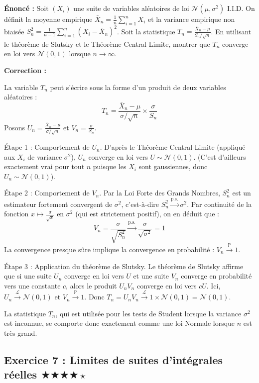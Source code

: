 \documentclass[11pt,a4paper]{article}
\begin{document}
\textbf{Énoncé :}
Soit $(X_i)$ une suite de variables aléatoires de loi $\mathcal{N}(\mu, \sigma^2)$ I.I.D.
On définit la moyenne empirique $\bar{X}_n = \frac{1}{n} \sum_{i=1}^n X_i$ et la variance empirique non biaisée $S_n^2 = \frac{1}{n-1} \sum_{i=1}^n (X_i - \bar{X}_n)^2$.
Soit la statistique $T_n = \frac{\bar{X}_n - \mu}{S_n / \sqrt{n}}$.
En utilisant le théorème de Slutsky et le Théorème Central Limite, montrer que $T_n$ converge en loi vers $\mathcal{N}(0, 1)$ lorsque $n \to \infty$.

\textbf{Correction :}

La variable $T_n$ peut s'écrire sous la forme d'un produit de deux variables aléatoires :
$$T_n = \frac{\bar{X}_n - \mu}{\sigma / \sqrt{n}} \times \frac{\sigma}{S_n}$$
Posons $U_n = \frac{\bar{X}_n - \mu}{\sigma / \sqrt{n}}$ et $V_n = \frac{\sigma}{S_n}$.

Étape 1 : Comportement de $U_n$.
D'après le Théorème Central Limite (appliqué aux $X_i$ de variance $\sigma^2$), $U_n$ converge en loi vers $U \sim \mathcal{N}(0, 1)$. (C'est d'ailleurs exactement vrai pour tout $n$ puisque les $X_i$ sont gaussiennes, donc $U_n \sim \mathcal{N}(0, 1)$).

Étape 2 : Comportement de $V_n$.
Par la Loi Forte des Grands Nombres, $S_n^2$ est un estimateur fortement convergent de $\sigma^2$, c'est-à-dire $S_n^2 \xrightarrow{\text{p.s.}} \sigma^2$.
Par continuité de la fonction $x \mapsto \frac{\sigma}{\sqrt{x}}$ en $\sigma^2$ (qui est strictement positif), on en déduit que :
$$V_n = \frac{\sigma}{\sqrt{S_n^2}} \xrightarrow{\text{p.s.}} \frac{\sigma}{\sqrt{\sigma^2}} = 1$$
La convergence presque sûre implique la convergence en probabilité : $V_n \xrightarrow{\mathbb{P}} 1$.

Étape 3 : Application du théorème de Slutsky.
Le théorème de Slutsky affirme que si une suite $U_n$ converge en loi vers $U$ et une suite $V_n$ converge en probabilité vers une constante $c$, alors le produit $U_n V_n$ converge en loi vers $c U$.
Ici, $U_n \xrightarrow{\mathcal{L}} \mathcal{N}(0, 1)$ et $V_n \xrightarrow{\mathbb{P}} 1$.
Donc $T_n = U_n V_n \xrightarrow{\mathcal{L}} 1 \times \mathcal{N}(0, 1) = \mathcal{N}(0, 1)$.

La statistique $T_n$, qui est utilisée pour les tests de Student lorsque la variance $\sigma^2$ est inconnue, se comporte donc exactement comme une loi Normale lorsque $n$ est très grand.


\vspace{1cm}
\subsection*{Exercice 7 : Limites de suites d'intégrales réelles \quad $\bigstar\bigstar\bigstar\bigstar\star$}
\end{document}
